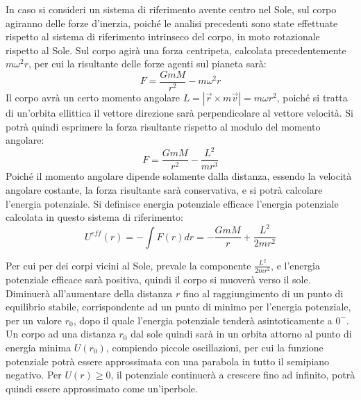 \documentclass{article}
\numberwithin{equation}{subsection}
\begin{document}
In caso si consideri un sistema di riferimento avente centro nel Sole, sul corpo agiranno delle forze d'inerzia, poiché le analisi 
precedenti sono state effettuate rispetto al sistema di riferimento intrinseco del corpo, in moto rotazionale rispetto al Sole. Sul corpo agirà una forza centripeta, calcolata 
precedentemente $m\omega^2r$, per cui la risultante delle forze agenti sul pianeta sarà:
\begin{equation*}
    F=\displaystyle\frac{GmM}{r^2}-m\omega^2r
\end{equation*}
Il corpo avrà un certo momento angolare $L=|\vec{r}\times m\vec{v}|=m\omega r^2$, poiché si tratta di un'orbita ellittica il vettore direzione 
sarà perpendicolare al vettore velocità. Si potrà quindi esprimere la forza risultante rispetto al modulo del momento angolare:
\begin{equation*}
    F=\displaystyle\frac{GmM}{r^2}-\frac{L^2}{mr^3}
\end{equation*}
Poiché il momento angolare dipende solamente dalla distanza, essendo la velocità angolare costante, la forza risultante sarà conservativa, e si potrà 
calcolare l'energia potenziale. Si definisce energia potenziale efficace l'energia potenziale calcolata in questo sistema di riferimento:
\begin{equation}
    U^{eff}(r)=-\int F(r)dr=-\displaystyle\frac{GmM}{r}+\frac{L^2}{2mr^2}
\end{equation}

\begin{center}
\end{center}

Per cui per dei corpi vicini al Sole, prevale la componente $\displaystyle\frac{L^2}{2mr^2}$, e l'energia potenziale efficace sarà positiva, quindi 
il corpo si muoverà verso il sole. Diminuerà all'aumentare della distanza $r$ fino al raggiungimento di un punto di equilibrio stabile, corrispondente ad un punto 
di minimo per l'energia potenziale, per un valore 
$r_0$, dopo il quale l'energia potenziale tenderà asintoticamente a $0^-$. Un corpo ad una distanza $r_0$ dal sole quindi sarà in un orbita attorno al 
punto di energia minima $U(r_0)$, compiendo piccole oscillazioni, per cui la funzione potenziale potrà essere approssimata con una parabola in 
tutto il semipiano negativo. Per $U(r)\geq0$, il potenziale continuerà a crescere fino ad infinito, potrà quindi essere approssimato come un'iperbole. 
\end{document}
